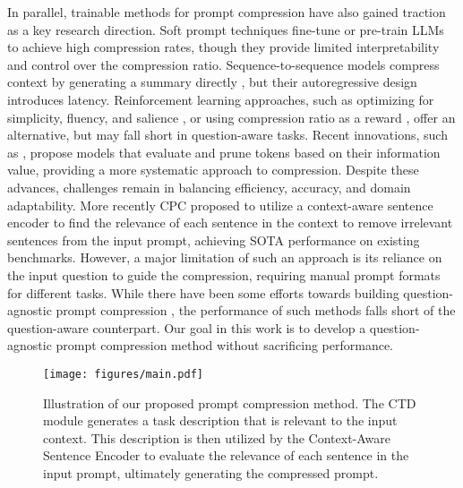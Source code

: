 In parallel, trainable methods for prompt compression have also gained traction as a key research direction. Soft prompt techniques \citep{wang2024adapting, bulatov2022recurrent, chevalier2023adapting} fine-tune or pre-train LLMs to achieve high compression rates, though they provide limited interpretability and control over the compression ratio. Sequence-to-sequence models compress context by generating a summary directly \citep{xu2024recomp}, but their autoregressive design introduces latency. Reinforcement learning approaches, such as optimizing for simplicity, fluency, and salience \citep{labankeep}, or using compression ratio as a reward \citep{jung2024discrete}, offer an alternative,  but may fall short in question-aware tasks. Recent innovations, such as \citep{pan2024llmlingua}, propose models that evaluate and prune tokens based on their information value, providing a more systematic approach to compression. Despite these advances, challenges remain in balancing efficiency, accuracy, and domain adaptability. More recently CPC \cite{CPC} proposed to utilize a context-aware sentence encoder to find the relevance of each sentence in the context to remove irrelevant sentences from the input prompt, achieving SOTA performance on existing benchmarks. However, a major limitation of such an approach is its reliance on the input question to guide the compression, requiring manual prompt formats for different tasks. While there have been some efforts towards building question-agnostic prompt compression \cite{pan2024llmlingua}, the performance of such methods falls short of the question-aware counterpart. Our goal in this work is to develop a question-agnostic prompt compression method without sacrificing performance.




\begin{figure*}
    \centering
    \texttt{[image: figures/main.pdf]}
    \caption{Illustration of our proposed prompt compression method. The CTD module generates a task description that is relevant to the input context. This description is then utilized by the Context-Aware Sentence Encoder to evaluate the relevance of each sentence in the input prompt, ultimately generating the compressed prompt.}
    \label{fig:main}
\end{figure*}



